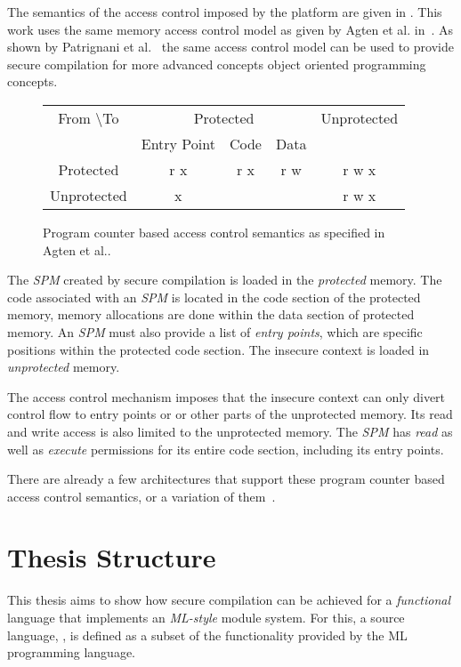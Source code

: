 The semantics of the access control imposed by the platform are given in .
This work uses the same memory access control model as given by Agten et al. in~\cite{Agten:2012:SCM:2354412.2355247}.
As shown by Patrignani et al.~\cite{Patrignani} the same access control model can be used to provide secure compilation for more advanced concepts object oriented programming concepts.

\begin{figure}[htb]
    \centering
	\begin{tabular}{|c|c|c|c|c|}
		\hline
		From \textbackslash To & \multicolumn{3}{c|}{Protected} & Unprotected \\
		& Entry Point & Code & Data & \\ \hline
		Protected & r x & r x & r w & r w x \\ \hline
		Unprotected & x & & & r w x \\ \hline
	\end{tabular}
    \caption[PCBAC Semantics]{Program counter based access control semantics as specified in Agten et al.\cite{Agten:2012:SCM:2354412.2355247}. \label{fig:AccessControlSemantics}}
\end{figure}

The \emph{SPM} created by secure compilation is loaded in the \emph{protected} memory.
The code associated with an \emph{SPM} is located in the code section of the protected memory, memory allocations are done within the data section of protected memory.
An \emph{SPM} must also provide a list of \emph{entry points}, which are specific positions within the protected code section.
The insecure context is loaded in \emph{unprotected} memory.

The access control mechanism imposes that the insecure context can only divert control flow to entry points or or other parts of the unprotected memory.
Its read and write access is also limited to the unprotected memory.
The \emph{SPM} has \emph{read} as well as \emph{execute} permissions for its entire code section, including its entry points.

There are already a few architectures that support these program counter based access control semantics, or a variation of them~\cite{Fides, Salus, Sancus}.

\section{Thesis Structure}
This thesis aims to show how secure compilation can be achieved for a \emph{functional} language that implements an \emph{ML-style} module system.
For this, a source language, \emph{\MiniML}, is defined as a subset of the functionality provided by the ML programming language.

